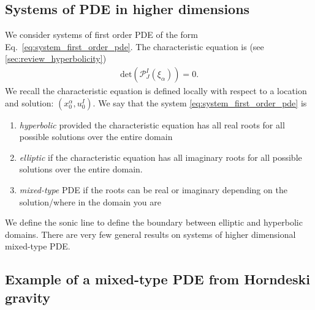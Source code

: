 \documentclass{ws-ijmpd}
\begin{document}
\subsection{Systems of PDE in higher dimensions
   \label{sec:systems_higher_dimensions_mixed}
}
We consider systems of first order PDE of the form 
Eq.~\eqref{eq:system_first_order_pde}.
The characteristic equation is (see \ref{sec:review_hyperbolicity}) 
\begin{align}
   \mathrm{det}\left(\mathcal{P}^I_J\left(\xi_{\alpha}\right)\right)
   =
   0
   .
\end{align}
We recall the characteristic equation is defined locally with respect
to a location and solution: 
$\left(x^{\alpha}_0,u^I_0\right)$.
We say that 
the system \eqref{eq:system_first_order_pde} is 
\begin{enumerate}
   \item \emph{hyperbolic} provided the characteristic equation has
all real roots for all possible solutions over the entire domain
   \item \emph{elliptic} if the characteristic equation
has all imaginary roots for all possible solutions over the entire domain.
   \item \emph{mixed-type} PDE if the roots can be real or
imaginary depending on the solution/where in the domain you are
\end{enumerate}
We define the sonic line to define the boundary between elliptic
and hyperbolic domains. There are very few general
results on systems of higher dimensional mixed-type PDE.

\subsection{Example of a mixed-type PDE from Horndeski gravity}
\end{document}
